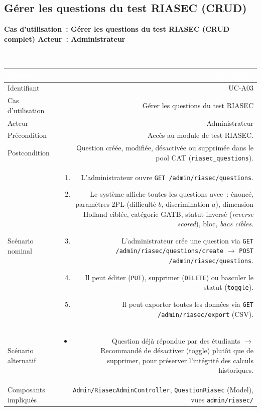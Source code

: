 \documentclass[a4paper,12pt]{article}
\newcommand{\ucheader}[2]{%
  \noindent\colorbox{capblue}{\parbox{\dimexpr\linewidth-2\fboxsep}{%
    \color{white}\bfseries\large Cas d'utilisation~: #1 \hfill \normalsize Acteur~: #2
  }}\\[2pt]
}
\begin{document}
\vspace{1em}

\subsection{Gérer les questions du test RIASEC (CRUD)}
\ucheader{Gérer les questions du test RIASEC (CRUD complet)}{Administrateur}

\noindent
\begin{tabular}{|L|R|}
\hline
{}\textcolor{white}{\textbf{Champ}} & \textcolor{white}{\textbf{Description}} \\
\hline
{}Identifiant & UC-A03 \\
\hline
Cas d'utilisation & Gérer les questions du test RIASEC \\
\hline
{}Acteur & Administrateur \\
\hline
Précondition & Accès au module de test RIASEC. \\
\hline
{}Postcondition & Question créée, modifiée, désactivée ou supprimée dans le pool CAT (\texttt{riasec\_questions}). \\
\hline
Scénario nominal &
\begin{enumerate}
  \item L'administrateur ouvre \texttt{GET /admin/riasec/questions}.
  \item Le système affiche toutes les questions avec~: énoncé, paramètres 2PL (difficulté $b$, discrimination $a$), dimension Holland ciblée, catégorie GATB, statut inversé (\textit{reverse scored}), bloc, \textit{bacs cibles}.
  \item L'administrateur crée une question via \texttt{GET /admin/riasec/questions/create} $\rightarrow$ \texttt{POST /admin/riasec/questions}.
  \item Il peut éditer (\texttt{PUT}), supprimer (\texttt{DELETE}) ou basculer le statut (\texttt{toggle}).
  \item Il peut exporter toutes les données via \texttt{GET /admin/riasec/export} (CSV).
\end{enumerate} \\
\hline
{}Scénario alternatif &
\begin{itemize}
  \item Question déjà répondue par des étudiants $\rightarrow$ Recommandé de désactiver (toggle) plutôt que de supprimer, pour préserver l'intégrité des calculs historiques.
\end{itemize} \\
\hline
Composants impliqués & \texttt{Admin/RiasecAdminController}, \texttt{QuestionRiasec} (Model), vues \texttt{admin/riasec/} \\
\hline
\end{tabular}
\end{document}

